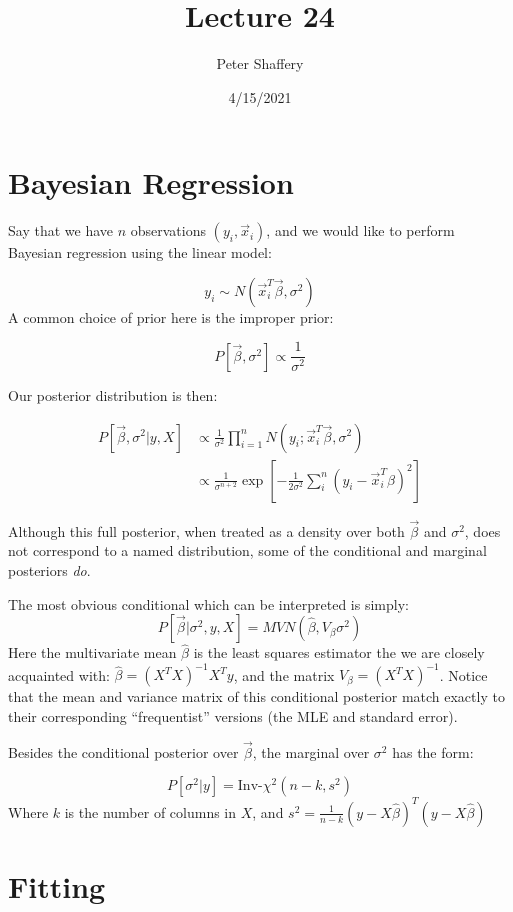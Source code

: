 \documentclass[
]{article}
\title{Lecture 24}
\author{Peter Shaffery}
\date{4/15/2021}
\begin{document}
\maketitle

\hypertarget{bayesian-regression}{%
\section{Bayesian Regression}\label{bayesian-regression}}

Say that we have \(n\) observations \((y_i,\vec x_i)\), and we would
like to perform Bayesian regression using the linear model:

\[
y_i \sim N( \vec x_i^T \vec \beta, \sigma^2)
\] A common choice of prior here is the improper prior:

\[
P[\vec \beta, \sigma^2] \propto \frac{1}{\sigma^2}
\]

Our posterior distribution is then:

\[
\begin{split}
P[\vec \beta, \sigma^2 | y, X] &\propto \frac{1}{\sigma^2} \prod_{i=1}^n N(y_i; \vec x_i^T \vec \beta , \sigma^2) \\
&\propto \frac{1}{\sigma^{n+2}} \exp \left[-\frac{1}{2 \sigma^2} \sum_i^n(y_i - \vec x_i^T \beta)^2 \right]
\end{split}
\]

Although this full posterior, when treated as a density over both
\(\vec \beta\) and \(\sigma^2\), does not correspond to a named
distribution, some of the conditional and marginal posteriors \emph{do}.

The most obvious conditional which can be interpreted is simply: \[
P[\vec \beta| \sigma^2, y, X] = MVN( \hat \beta, V_\beta \sigma^2 )
\] Here the multivariate mean \(\hat \beta\) is the least squares
estimator the we are closely acquainted with:
\(\hat \beta = (X^TX)^{-1}X^Ty\), and the matrix
\(V_{\beta} = (X^TX)^{-1}\). Notice that the mean and variance matrix of
this conditional posterior match exactly to their corresponding
``frequentist'' versions (the MLE and standard error).

Besides the conditional posterior over \(\vec \beta\), the marginal over
\(\sigma^2\) has the form:

\[
P[\sigma^2 | y] = \text{Inv-}\chi^2(n-k, s^2)
\] Where \(k\) is the number of columns in \(X\), and
\(s^2= \frac{1}{n-k}(y-X \hat \beta)^T(y-X \hat \beta)\)

\hypertarget{fitting}{%
\section{Fitting}\label{fitting}}
\end{document}
